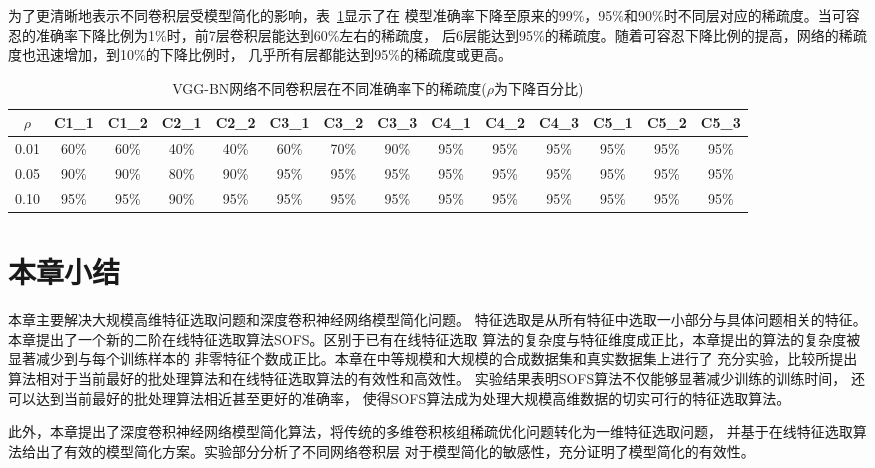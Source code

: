 \documentclass[doctor]{ustcthesis}
\begin{document}
为了更清晰地表示不同卷积层受模型简化的影响，表~\ref{tab:vgg-bn-layer-sparsity}显示了在
模型准确率下降至原来的99\%，95\%和90\%时不同层对应的稀疏度。当可容忍的准确率下降比例为1\%时，前7层卷积层能达到60\%左右的稀疏度，
后6层能达到95\%的稀疏度。随着可容忍下降比例的提高，网络的稀疏度也迅速增加，到10\%的下降比例时，
几乎所有层都能达到95\%的稀疏度或更高。

\begin{table}[t]
    \centering
    \caption{VGG-BN网络不同卷积层在不同准确率下的稀疏度($\rho$为下降百分比)}
    \label{tab:vgg-bn-layer-sparsity}
    \footnotesize
    \tabcolsep=1.6mm
    \begin{tabular}{|c|c|c|c|c|c|c|c|c|c|c|c|c|c|}
        \hline
        $\rho$  & C1\_1 & C1\_2 & C2\_1 & C2\_2 & C3\_1 & C3\_2 & C3\_3 & C4\_1 &  C4\_2 & C4\_3 & C5\_1  & C5\_2 & C5\_3 \\ \hline
        0.01  & 60\% & 60\% & 40\% & 40\% & 60\% & 70\% & 90\% & 95\% &  95\% & 95\% & 95\%  & 95\% & 95\% \\ \hline
        0.05  & 90\% & 90\% & 80\% & 90\% & 95\% & 95\% & 95\% & 95\% &  95\% & 95\% & 95\%  & 95\% & 95\% \\ \hline
        0.10  & 95\% & 95\% & 90\% & 95\% & 95\% & 95\% & 95\% & 95\% &  95\% & 95\% & 95\%  & 95\% & 95\% \\ \hline
    \end{tabular}
\end{table}


\section{本章小结}
本章主要解决大规模高维特征选取问题和深度卷积神经网络模型简化问题。
特征选取是从所有特征中选取一小部分与具体问题相关的特征。
本章提出了一个新的二阶在线特征选取算法SOFS。区别于已有在线特征选取
算法的复杂度与特征维度成正比，本章提出的算法的复杂度被显著减少到与每个训练样本的
非零特征个数成正比。本章在中等规模和大规模的合成数据集和真实数据集上进行了
充分实验，比较所提出算法相对于当前最好的批处理算法和在线特征选取算法的有效性和高效性。
实验结果表明SOFS算法不仅能够显著减少训练的训练时间，
还可以达到当前最好的批处理算法相近甚至更好的准确率，
使得SOFS算法成为处理大规模高维数据的切实可行的特征选取算法。

此外，本章提出了深度卷积神经网络模型简化算法，将传统的多维卷积核组稀疏优化问题转化为一维特征选取问题，
并基于在线特征选取算法给出了有效的模型简化方案。实验部分分析了不同网络卷积层
对于模型简化的敏感性，充分证明了模型简化的有效性。
\end{document}
